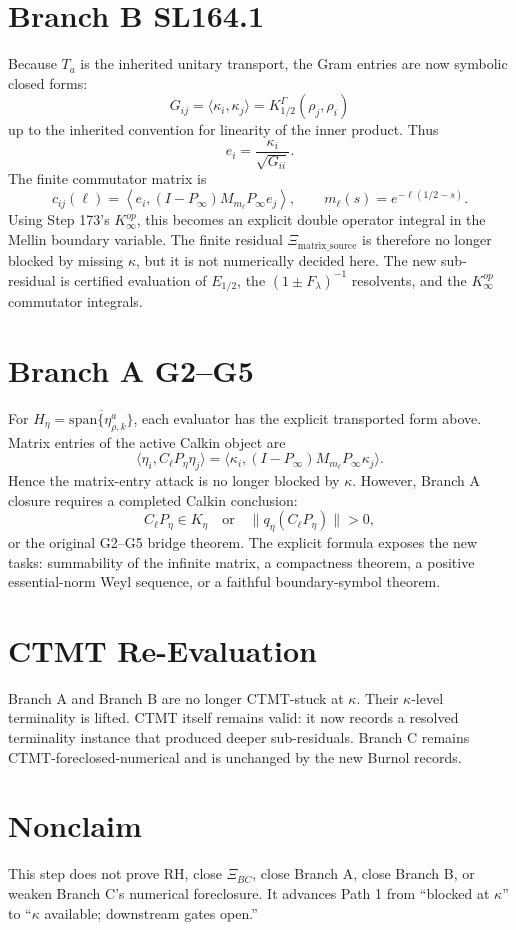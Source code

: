 \documentclass[11pt]{article}
\begin{document}
\section*{Branch B SL164.1}

Because \(T_a\) is the inherited unitary transport, the Gram entries are now
symbolic closed forms:
\[
  G_{ij}=\langle \kappa_i,\kappa_j\rangle
  =
  K_{1/2}^\Gamma(\rho_j,\rho_i)
\]
up to the inherited convention for linearity of the inner product.  Thus
\[
  e_i=\frac{\kappa_i}{\sqrt{G_{ii}}}.
\]
The finite commutator matrix is
\[
  c_{ij}(\ell)
  =
  \left\langle
    e_i,(I-P_\infty)M_{m_\ell}P_\infty e_j
  \right\rangle,
  \qquad
  m_\ell(s)=e^{-\ell(1/2-s)}.
\]
Using Step 173's \(K_\infty^{op}\), this becomes an explicit double
operator integral in the Mellin boundary variable.  The finite residual
\(\Xi_{\mathrm{matrix\_source}}\) is therefore no longer blocked by
missing \(\kappa\), but it is not numerically decided here.  The new
sub-residual is certified evaluation of \(E_{1/2}\), the
\((1\pm F_\lambda)^{-1}\) resolvents, and the \(K_\infty^{op}\) commutator
integrals.

\section*{Branch A G2--G5}

For \(H_\eta=\overline{\mathrm{span}\{\eta^a_{\rho,k}\}}\), each evaluator
has the explicit transported form above.  Matrix entries of the active
Calkin object are
\[
  \langle \eta_i,C_\ell P_\eta\eta_j\rangle
  =
  \langle
  \kappa_i,(I-P_\infty)M_{m_\ell}P_\infty\kappa_j
  \rangle.
\]
Hence the matrix-entry attack is no longer blocked by \(\kappa\).
However, Branch A closure requires a completed Calkin conclusion:
\[
  C_\ell P_\eta\in K_\eta
  \quad\text{or}\quad
  \|q_\eta(C_\ell P_\eta)\|>0,
\]
or the original G2--G5 bridge theorem.  The explicit formula exposes the
new tasks: summability of the infinite matrix, a compactness theorem, a
positive essential-norm Weyl sequence, or a faithful boundary-symbol theorem.

\section*{CTMT Re-Evaluation}

Branch A and Branch B are no longer CTMT-stuck at \(\kappa\).  Their
\(\kappa\)-level terminality is lifted.  CTMT itself remains valid: it now
records a resolved terminality instance that produced deeper sub-residuals.
Branch C remains CTMT-foreclosed-numerical and is unchanged by the new
Burnol records.

\section*{Nonclaim}

This step does not prove RH, close \(\Xi_{BC}\), close Branch A, close Branch
B, or weaken Branch C's numerical foreclosure.  It advances Path 1 from
``blocked at \(\kappa\)'' to ``\(\kappa\) available; downstream gates open.''
\end{document}
